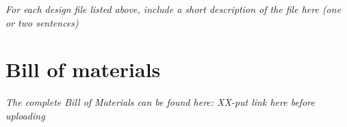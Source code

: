 \documentclass[11pt, letterpaper]{article}
\begin{document}
\textit{For each design file listed above, include a short description of the file here (one or two sentences)}

\section{Bill of materials}


\textit{The complete Bill of Materials can be found here: XX-put link here before uploading}
%
\end{document}
